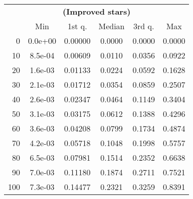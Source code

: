 \begin{tabular}{r|ccccc}
  \multicolumn{6}{c}{{\bf  (Improved stars)}} \\
  & Min & 1st q. & Median & 3rd q. & Max \\ \hline\hline
  0 & 0.0e+00 & 0.00000 & 0.0000 & 0.0000 & 0.0000
\\ 10 & 8.5e-04 & 0.00609 & 0.0110 & 0.0356 & 0.0922
\\ 20 & 1.6e-03 & 0.01133 & 0.0224 & 0.0592 & 0.1628
\\ 30 & 2.1e-03 & 0.01712 & 0.0354 & 0.0859 & 0.2507
\\ 40 & 2.6e-03 & 0.02347 & 0.0464 & 0.1149 & 0.3404
\\ 50 & 3.1e-03 & 0.03175 & 0.0612 & 0.1388 & 0.4296
\\ 60 & 3.6e-03 & 0.04208 & 0.0799 & 0.1734 & 0.4874
\\ 70 & 4.2e-03 & 0.05718 & 0.1048 & 0.1998 & 0.5757
\\ 80 & 6.5e-03 & 0.07981 & 0.1514 & 0.2352 & 0.6638
\\ 90 & 7.0e-03 & 0.11180 & 0.1874 & 0.2711 & 0.7521
\\ 100 & 7.3e-03 & 0.14477 & 0.2321 & 0.3259 & 0.8391
\end{tabular}
